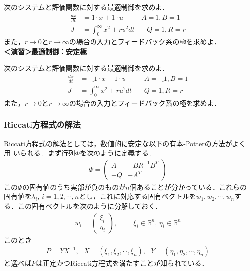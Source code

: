 次のシステムと評価関数に対する最適制御を求めよ．
\begin{align*}
	\frac{dx}{dt} & = 1 \cdot x + 1 \cdot u \ \ \ \ \ \ \ \ \ \ \ \ A=1,B=1\\
	J & = \int_0^{\infty} x^2 + r u^2 dt \ \ \ \ \ \ \ \ Q=1,R=r
\end{align*}
また，$r\rightarrow 0$と$r\rightarrow \infty$の場合の入力とフィードバック系の極を求めよ．
\\

\noindent
{\bf ＜演習＞最適制御：安定極} \nopagebreak

次のシステムと評価関数に対する最適制御を求めよ．
\begin{align*}
	\frac{dx}{dt} & = \underline{-1} \cdot x + 1 \cdot u \ \ \ \ \ \ \ \ \ \ \ \ A=\underline{-1},B=1\\
	J & = \int_0^{\infty} x^2 + r u^2 dt \ \ \ \ \ \ \ \ Q=1,R=r
\end{align*}
また，$r\rightarrow 0$と$r\rightarrow \infty$の場合の入力とフィードバック系の極を求めよ．

\subsubsection{Riccati方程式の解法}

Riccati方程式の解法としては，数値的に安定な以下の有本-Potterの方法がよく用
いられる．まず行列$\Phi$を次のように定義する．
\begin{align}
 \Phi = \left(\begin{array}{cc}
	       A  & - B R^{-1} B^T \\
	       -Q & - A^T
	      \end{array}\right)
\end{align}
この$\Phi$の固有値のうち実部が負のものが$n$個あることが分かっている．これらの固有値を$\lambda_i$, $i=1,2,\cdots,n$とし，これに対応する固有ベクトルを$w_1, w_2, \cdots, w_n$する．この固有ベクトルを次のように分解しておく．
\begin{align}
 w_i = \left(\begin{array}{c}
	      \xi_i \\
	      \eta_i
	     \end{array}\right), \hspace{1cm} \xi_i \in {\mathbb R}^n, \ \eta_i \in {\mathbb R}^n
\end{align}
このとき
\begin{align}
	P = Y X^{-1}, \ \ \ 
	X = (\xi_1, \xi_2, \cdots, \xi_n), \ \ \ 
	Y = (\eta_1, \eta_2, \cdots, \eta_n)
\end{align}
と選べば$P$は正定かつRiccati方程式を満たすことが知られている．

